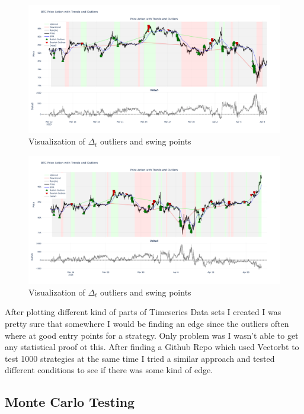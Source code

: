 \documentclass[12pt]{article}
\begin{document}
\begin{figure}[H]
  \centering
  \includegraphics[width=\textwidth]{imgs/plotting_of_my_idea.png}
  \caption{Visualization of $\Delta_t$ outliers and swing points}
\end{figure}
\begin{figure}[H]
  \centering
  \includegraphics[width=\textwidth]{imgs/v2_plotting my idea.png}
  \caption{Visualization of $\Delta_t$ outliers and swing points}
\end{figure}

After plotting different kind of parts of Timeseries Data sets I created I was pretty sure that somewhere I would be finding an edge since the outliers often where at good entry points for a strategy. Only problem was I wasn't able to get any statistical proof ot this.
After finding a Github Repo which used Vectorbt to test 1000 strategies at the same time I tried a similar approach and tested different conditions to see if there was some kind of edge.









\subsection{Monte Carlo Testing}
\end{document}
